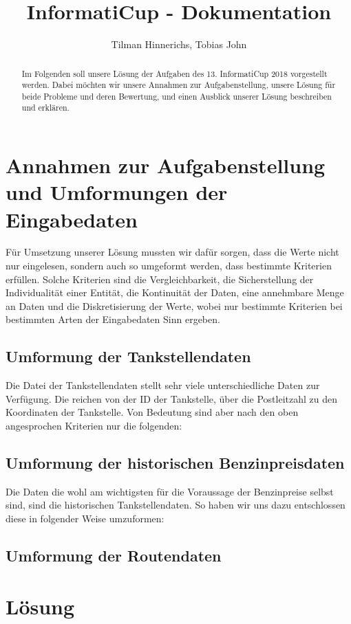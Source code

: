 \documentclass[11pt]{article}
\title{InformatiCup - Dokumentation}
\author{Tilman Hinnerichs, Tobias John}
\begin{document}
\maketitle

\begin{abstract}
	Im Folgenden soll unsere Lösung der Aufgaben des 13. InformatiCup 2018 vorgestellt werden. Dabei möchten wir unsere Annahmen zur Aufgabenstellung, unsere Lösung für beide Probleme und deren Bewertung, und einen Ausblick unserer Lösung beschreiben und erklären.  
\end{abstract}

\section{Annahmen zur Aufgabenstellung und Umformungen der Eingabedaten}
	Für Umsetzung unserer Lösung mussten wir dafür sorgen, dass die Werte nicht nur eingelesen, sondern auch so umgeformt werden, dass bestimmte Kriterien erfüllen. Solche Kriterien sind die Vergleichbarkeit, die Sicherstellung der Individualität einer Entität, die Kontinuität der Daten, eine annehmbare Menge an Daten und die Diskretisierung der Werte, wobei nur bestimmte Kriterien bei bestimmten Arten der Eingabedaten Sinn ergeben. 
\subsection{Umformung der Tankstellendaten}
	Die Datei der Tankstellendaten stellt sehr viele unterschiedliche Daten zur Verfügung. Die reichen von der ID der Tankstelle, über die Postleitzahl zu den Koordinaten der Tankstelle. Von Bedeutung sind aber nach den oben angesprochen Kriterien nur die folgenden: \\ 
\subsection{Umformung der historischen Benzinpreisdaten}
	Die Daten die wohl am wichtigsten für die Voraussage der Benzinpreise selbst sind, sind die historischen Tankstellendaten. So haben wir uns dazu entschlossen diese in folgender Weise umzuformen: \\
	
\subsection{Umformung der Routendaten}
\section{Lösung}
\end{document}
